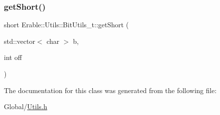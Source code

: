 \mbox{\label{class_erable_1_1_utils_1_1_bit_utils__t_adec90f50d80b37545da2470dcf026bfe}} 
\subsubsection{\texorpdfstring{getShort()}{getShort()}}
{\footnotesize\ttfamily short Erable\+::\+Utils\+::\+Bit\+Utils\+\_\+t\+::get\+Short (\begin{DoxyParamCaption}\item[{std\+::vector$<$ char $>$}]{b,  }\item[{int}]{off }\end{DoxyParamCaption})\hspace{0.3cm}{\ttfamily [inline]}}



The documentation for this class was generated from the following file\+:\begin{DoxyCompactItemize}
\item 
Global/\mbox{\hyperlink{_utils_8h}{Utils.\+h}}\end{DoxyCompactItemize}
